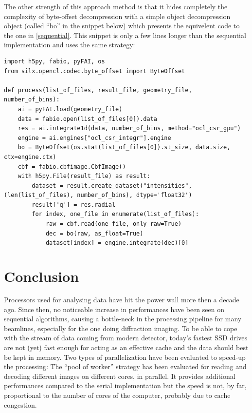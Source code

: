 \documentclass[preprint, pdf]{iucr}              %
\begin{document}
The other strength of this approach method is that it hides completely the
complexity of byte-offset decompression with a simple object decompression
object (called ``bo'' in the snippet below) which presents the equivelent code
to the one in \ref{sequential}.
This snippet is only a few lines longer than the sequential implementation and
uses the same strategy:

\begin{verbatim}
import h5py, fabio, pyFAI, os
from silx.opencl.codec.byte_offset import ByteOffset

def process(list_of_files, result_file, geometry_file, number_of_bins):
    ai = pyFAI.load(geometry_file)
    data = fabio.open(list_of_files[0]).data
    res = ai.integrate1d(data, number_of_bins, method="ocl_csr_gpu")
    engine = ai.engines["ocl_csr_integr"].engine
    bo = ByteOffset(os.stat(list_of_files[0]).st_size, data.size, ctx=engine.ctx)
    cbf = fabio.cbfimage.CbfImage()
    with h5py.File(result_file) as result:
        dataset = result.create_dataset("intensities", (len(list_of_files), number_of_bins), dtype='float32')
        result['q'] = res.radial
        for index, one_file in enumerate(list_of_files):
            raw = cbf.read(one_file, only_raw=True)
            dec = bo(raw, as_float=True)
            dataset[index] = engine.integrate(dec)[0]
\end{verbatim}


\section{Conclusion}

Processors used for analysing data have hit the power wall more then
a  decade ago.
Since then,  no noticeable increase in performances have been seen on
sequential algorithms, causing a bottle-neck in the processing
pipeline for many beamlines, especially for the one doing diffraction imaging.
To be able to cope with the stream of data coming from modern detector,
today's fastest SSD drives are not (yet) fast  enough for acting as an
effective cache and the data should best be kept in memory.
Two types of parallelization have been evaluated to speed-up the processing:  
The ``pool of worker'' strategy has been evaluated for reading and decoding
different images on different cores, in parallel.
It provides additional performances compared to the serial implementation but
the speed is not, by far, proportional to the number of cores of the computer,
probably due to cache congestion.
\end{document}
